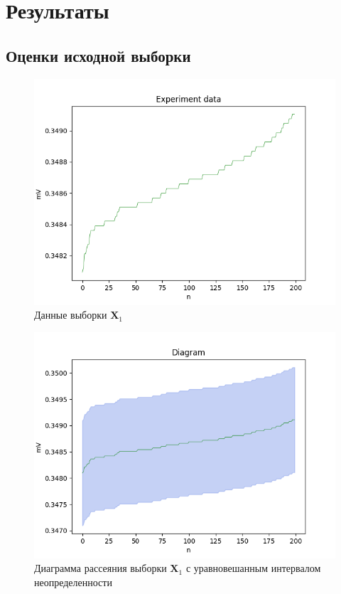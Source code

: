\section{Результаты}

\subsection{Оценки исходной выборки} 

\begin{figure}[H]
	\begin{center}
		\includegraphics[scale = 0.55]{resources/data.png}
	\end{center}
	\caption{Данные выборки $\bm{X}_1$}
\end{figure}

\begin{figure}[H]
	\begin{center}
		\includegraphics[scale = 0.55]{resources/diagram_beta_None.png}
	\end{center}
	\caption{Диаграмма рассеяния выборки $\bm{X}_1$ с уравновешанным интервалом неопределенности}
\end{figure}

